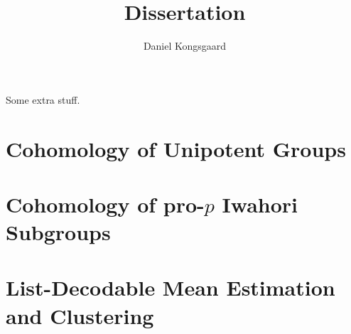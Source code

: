 \documentclass[letterpaper,oneside,english,11pt,openany]{memoir}
\title{Dissertation}
\author{Daniel Kongsgaard}
\begin{document}
\DoubleSpacing




\frontmatter

\tableofcontents*

\clearpage

\printnomenclature[4cm]

\clearpage

\begin{vplace}[0.7]
  Some extra stuff.
\end{vplace}

\clearpage

\mainmatter

\pagestyle{ruled}

\chapter{Cohomology of Unipotent Groups}%
\label{cha:cohunigps}



\chapter{Cohomology of pro-\texorpdfstring{$p$}{p} Iwahori Subgroups}%
\label{cha:cohiwagps}



\chapter{List-Decodable Mean Estimation and Clustering}%
\label{cha:robstat}



\clearpage

\backmatter

\pagestyle{plain}

\printbibliography

\clearpage

\printindex
\end{document}
